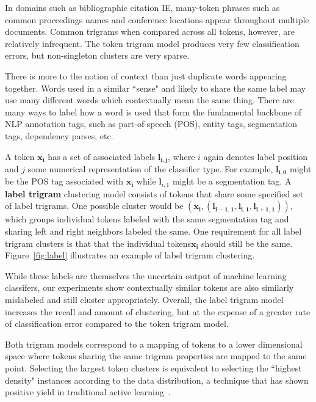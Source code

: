 In domains such as bibliographic citation IE, many-token phrases such as common proceedings names and conference locations appear throughout multiple documents.  Common trigrams when compared across all tokens, however, are relatively infrequent. The token trigram model produces very few classification errors, but non-singleton clusters are very sparse.

There is more to the notion of context than just duplicate words appearing together. Words used in a similar ``sense" and likely to share the same label may use many different words which contextually mean the same thing. There are many ways to label how a word is used that form the fundamental backbone of NLP annotation tags, such as part-of-speech (POS), entity tags, segmentation tags, dependency parses, etc.

A token $\mathbf{x_{i}}$ has a set of associated labels $\mathbf{l_{i,j}}$, where $i$ again denotes label position and $j$ some numerical representation of the classifier type. For example, $\mathbf{l_{i,0}}$ might be the POS tag associated with $\mathbf{x_{i}}$ while $\mathbf{l}_{i,1}$ might be a segmentation tag. A \textbf{label trigram} clustering model consists of tokens that share some specified set of label trigrams. One possible cluster would be $(\mathbf{x_{i}}, (\mathbf{l_{i-1,1}},\mathbf{l_{i,1}},\mathbf{l_{i+1,1}}))$, which groups individual tokens labeled with the same segmentation tag and sharing left and right neighbors labeled the same. One requirement for all label trigram clusters is that that the individual tokens$\mathbf{x_{i}}$ should still be the same. Figure~\ref{fig:label} illustrates an example of label trigram clustering.

While these labels are themselves the uncertain output of machine learning classifers, our experiments show contextually similar tokens are also similarly mislabeled and still cluster appropriately. Overall, the label trigram model increases the recall and amount of clustering, but at the expense of a greater rate of classification error compared to the token trigram model.

Both trigram models correspond to a mapping of tokens to a lower dimensional space where tokens sharing the same trigram properties are mapped to the same point. Selecting the largest token clusters is equivalent to selecting the ``highest density" instances according to the data distribution, a technique that has shown positive yield in traditional active learning~\cite{Guo:2007:OAL:1625275.1625408}.

